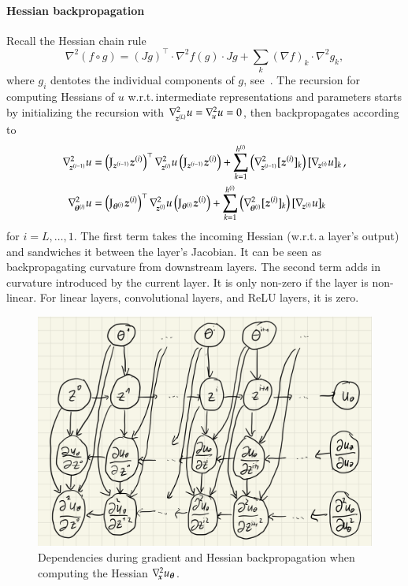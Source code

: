 \paragraph{Hessian backpropagation}
Recall the Hessian chain rule
\begin{equation*}
  \nabla^2 (f\circ g) = (J g)^\top\cdot \nabla^2 f(g) \cdot Jg + \sum_{k} (\nabla f)_k \cdot \nabla^2 g_k,
\end{equation*}
where $g_i$ dentotes the individual components of $g$, see~\cite{skorski2019chain}.
The recursion for computing Hessians of $u$
w.r.t.\,intermediate representations and parameters starts by initializing the
recursion with $\nabla_{\!{{\boldsymbol{z}}^{(L)}}}^{2}u = \nabla_{\!{u}}^{2} u = 0$, then
backpropagates according to
\begin{align}\label{eq:hessian-backpropagation}
  \begin{split}
    \gradsquared{\vz^{(i-1)}}u
    &=
      \left( \jac_{\vz^{(i-1)}} \vz^{(i)} \right)^{\top}
      \gradsquared{\vz^{(i)}}u
      \left( \jac_{\vz^{(i-1)}} \vz^{(i)} \right)
      +
      \sum_{k=1}^{h^{(i)}}
      \left(
      \gradsquared{\vz^{(i-1)}} [\vz^{(i)}]_k
      \right)
      [\grad{\vz^{(i)}} u]_k\,,
    \\
    \gradsquared{\vtheta^{(i)}}u
    &=
      \left( \jac_{\vtheta^{(i)}} \vz^{(i)} \right)^{\top}
      \gradsquared{\vz^{(i)}}u
      \left( \jac_{\vtheta^{(i)}} \vz^{(i)} \right)
      +
      \sum_{k=1}^{h^{(i)}}
      \left(
      \gradsquared{\vtheta^{(i)}} [\vz^{(i)}]_k
      \right)
      [\grad{\vz^{(i)}} u]_k
  \end{split}
\end{align}
for $i = L, \dots, 1$.
The first term takes the incoming Hessian (w.r.t.\,a layer's output) and sandwiches it between the layer's Jacobian.
It can be seen as backpropagating curvature from downstream layers.
The second term adds in curvature introduced by the current layer.
It is only non-zero if the layer is non-linear.
For linear layers, convolutional layers, and ReLU layers, it is zero.

\begin{figure}[t]
  \centering
  \includegraphics[width=0.6\linewidth]{figures/HBP_graph.png}
  \caption{Dependencies during gradient and Hessian backpropagation when computing the Hessian $\nabla_{\!{{\boldsymbol{x}}}}^{2}u_{{\boldsymbol{\theta}}}$.}\label{fig:hbp-dependencies}
  \label{fig:hbp-dependencies}
\end{figure}

